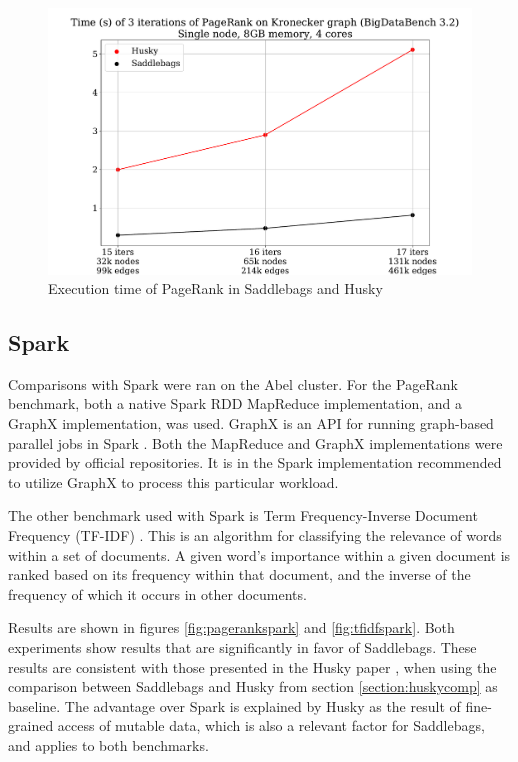 \documentclass{uit-report}
\begin{document}
\vskip 2cm

\begin{figure}[H]
	\centering
	\includegraphics[width=15cm]{illustrations/huskypagerank.pdf}
	\caption{Execution time of PageRank in Saddlebags and Husky}
	\label{fig:huskypagerank}
\end{figure}



\newpage
\subsection{Spark}\label{section:sparkeval}
Comparisons with Spark were ran on the Abel cluster. For the PageRank benchmark, both a native Spark RDD MapReduce implementation, and a GraphX implementation, was used. GraphX is an API for running graph-based parallel jobs in Spark \cite{graphx}. Both the MapReduce \cite{sparkpagerank} and GraphX \cite{graphxpagerank} implementations were provided by official repositories. It is in the Spark implementation recommended to utilize GraphX to process this particular workload.

The other benchmark used with Spark is Term Frequency-Inverse Document Frequency (TF-IDF) \cite{tfidf}. This is an algorithm for classifying the relevance of words within a set of documents. A given word's importance within a given document is ranked based on its frequency within that document, and the inverse of the frequency of which it occurs in other documents.

Results are shown in figures \ref{fig:pagerankspark} and \ref{fig:tfidfspark}. Both experiments show results that are significantly in favor of Saddlebags. These results are consistent with those presented in the Husky paper \cite{husky}, when using the comparison between Saddlebags and Husky from section \ref{section:huskycomp} as baseline. The advantage over Spark is explained by Husky as the result of fine-grained access of mutable data, which is also a relevant factor for Saddlebags, and applies to both benchmarks.
\end{document}
